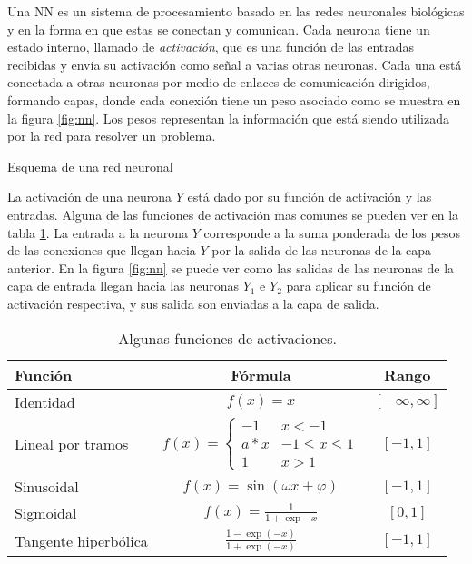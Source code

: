 Una NN es un sistema de procesamiento basado en las redes neuronales biológicas y en la forma en que estas se conectan y comunican. Cada neurona tiene un estado interno, llamado de {\em activación}, que es una función de las entradas recibidas y envía su activación como señal a varias otras neuronas. Cada una está conectada a otras neuronas por medio de enlaces de comunicación dirigidos, formando capas, donde cada conexión tiene un peso asociado como se muestra en la figura \ref{fig:nn}. Los pesos representan la información que está siendo utilizada por la red para resolver un problema.
\begin{imagen}
	\scalebox{0.8}{}
	\caption{Esquema de una red neuronal}
	\label{fig:nn}
\end{imagen}

La activación de una neurona $Y$ está dado por su función de activación y las entradas. Alguna de las funciones de activación mas comunes se pueden ver en la tabla \ref{tab:f_activacion}. La entrada a la neurona $Y$ corresponde a la suma ponderada de los pesos de las conexiones que llegan hacia $Y$ por la salida de las neuronas de la capa anterior. En la figura \ref{fig:nn} se puede ver como las salidas de las neuronas de la capa de entrada llegan hacia las neuronas $Y_1$ e $Y_2$ para aplicar su función de activación respectiva, y sus salida son enviadas a la capa de salida.

\begin{table}[H]
	\centering
	\begin{tabular}{|l|c|c|}\hline
		{\bf Función}	& {\bf Fórmula}	& {\bf Rango}\\\hline
		Identidad & $f(x) = x$	& $[-\infty, \infty]$\\\hline
		Lineal por tramos &
		$f(x) = \left\{
		\begin{array}{ll}
			-1		& x < -1\\
			a*x		& -1 \leq x \leq 1\\
			1		& x > 1
		\end{array}
		\right. $	& $[-1, 1]$\\\hline
		Sinusoidal	& $ f(x) = \sin(\omega x + \varphi) $	& $[-1, 1]$\\\hline
		Sigmoidal	& $f(x) = \frac{1}{1 + \exp{-x}}$	& $[0, 1]$\\\hline
		Tangente hiperbólica	& $\frac{1 - \exp(-x)}{1 + \exp(-x)}$	& $[-1, 1]$\\\hline
	\end{tabular}
	\caption{Algunas funciones de activaciones.}
	\label{tab:f_activacion}
\end{table}

